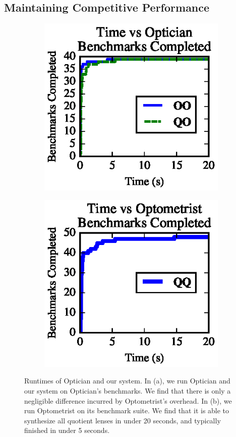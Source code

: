 \documentclass[acmsmall,review,anonymous]{acmart}
\begin{document}
\subsection{Maintaining Competitive Performance}

\begin{figure}[t]
\centering
\begin{subfigure}[b]{.49\textwidth}
\centering
\includegraphics{generated-graphs/times_opt}
\caption{}
\label{subfig:lenssize}
\end{subfigure}
\begin{subfigure}[b]{.49\textwidth}
\includegraphics{generated-graphs/times_new.eps}
\caption{}
\label{subfig:examplesused}
\end{subfigure}
\caption{Runtimes of Optician and our system.
In (a), we run Optician and our system on Optician's benchmarks.  We find that
there is only a negligible difference incurred by Optometrist's overhead.
In (b), we run Optometrist on its benchmark suite.  We find that it is able
to synthesize all quotient lenses in under 20 seconds, and typically
finished in under 5 seconds. }
\label{fig:times}
\end{figure}
\end{document}
